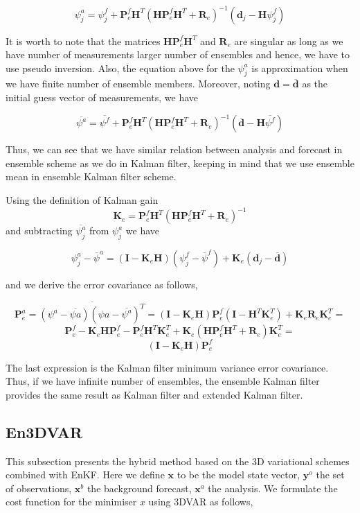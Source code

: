 \documentclass[a4,12pt]{article}
\begin{document}
$$\psi ^{a} _{j}= \psi ^{f}_{j} + \textbf{P} _{e} ^{f}\textbf{H} ^{T}(\textbf{HP}_{e} ^{f}\textbf{H} ^{T}+\textbf{R}_{e}) ^{-1}(\textbf{d}_{j}-\textbf{H}\psi ^{f}_{j})$$

It is worth to note that the matrices $\textbf{H}\textbf{P}^{f}_{e}\textbf{H}^{T}$ and $\textbf{R}_{e}$ are singular as long as we have number of measurements larger number of ensembles and hence, we have to use pseudo inversion. Also, the equation above for the $\psi ^{a} _{j}$ is approximation when we have finite number of ensemble members. Moreover, noting $\textbf{d} = \overline{\textbf{d}}$ as the initial guess vector of measurements, we have

$$\overline{\psi ^{a}} = \overline{\psi ^{f}} + \textbf{P} ^{f}_{e}\textbf{H} ^{T}(\textbf{HP}_{e} ^{f}\textbf{H} ^{T}+\textbf{R}_{e}) ^{-1}(\overline{\textbf{d}}-\textbf{H}\overline{\psi ^{f}})$$

Thus, we can see that we have similar relation between analysis and forecast in ensemble scheme as we do in Kalman filter, keeping in mind that we use ensemble mean in ensemble Kalman filter scheme.

Using the definition of Kalman gain $$\textbf{K}_{e} = \textbf{P}_{e}^{f}\textbf{H}^{T}(\textbf{H}\textbf{P}^{f}_{e}\textbf{H}^{T}+\textbf{R}_{e})^{-1}$$ and subtracting $\overline{\psi_{j}^{a}}$ from $\psi_{j}^{a}$ we have

$$\psi_{j}^{a}-\overline{\psi}^{a} = (\textbf{I}-\textbf{K}_{e}\textbf{H})(\psi_{j}^{f} - \overline{\psi}^{f})+\textbf{K}_{e}(\textbf{d}_{j}-\overline{\textbf{d}})$$

and we derive the error covariance as follows,

$$\textbf{P}_{e}^{a} = \overline {(\psi^{a} - \overline{\psi{a}})(\psi{a} - \overline{\psi^{a}})^{T}} = (\textbf{I}-\textbf{K}_{e}\textbf{H})\textbf{P}_{e}^{f}(\textbf{I}-\textbf{H}^{T}\textbf{K}_{e}^{T})+\textbf{K}_{e}\textbf{R}_{e}\textbf{K}_{e}^{T}=$$$$\textbf{P}_{e}^{f} - \textbf{K}_{e}\textbf{H}\textbf{P}_{e}^{f} - \textbf{P}_{e}^{f}\textbf{H}^{T}\textbf{K}_{e}^{T} + \textbf{K}_{e}(\textbf{H}\textbf{P}_{e}^{f}\textbf{H}^{T}+\textbf{R}_{e})\textbf{K}_{e}^{T} =$$$$ (\textbf{I}-\textbf{K}_{e}\textbf{H})\textbf{P}_{e}^{f}$$ 

The last expression is the Kalman filter minimum variance error covariance. Thus, if we have infinite number of ensembles, the ensemble Kalman filter provides the same result as Kalman filter and extended Kalman filter.

\subsection{En3DVAR}
This subsection presents the hybrid method based on the 3D variational schemes combined with EnKF.
Here we define $\textbf{x}$ to be the model state vector, $\textbf{y}^{o}$ the set of observations, $\textbf{x}^{b}$ the background forecast, $\textbf{x}^{a}$ the analysis. We formulate the cost function for the minimiser $x$ using 3DVAR as follows,
\end{document}
